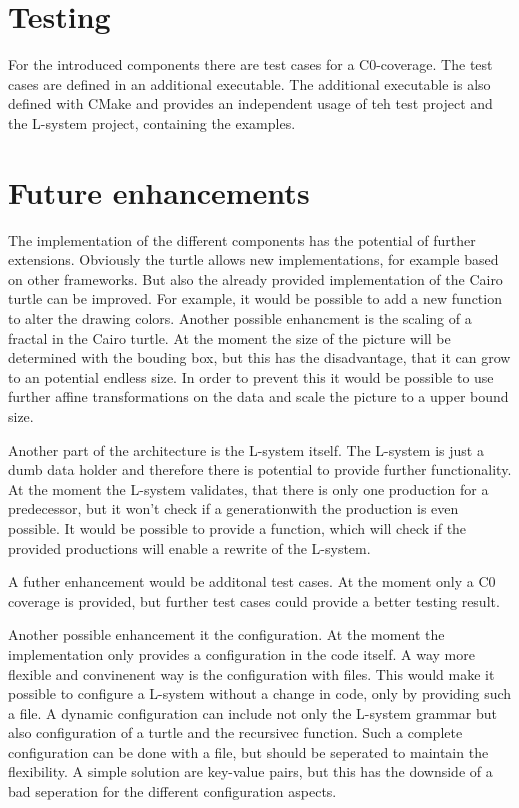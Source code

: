 \documentclass[english]{cpp-hmwk}
\begin{document}
\section{Testing}
\label{section:test}

For the introduced components there are test cases for a C0-coverage. The test cases are defined in an additional executable. The additional executable is also defined with CMake and provides an independent usage of teh test project and the L-system project, containing the examples.

\section{Future enhancements}

The implementation of the different components has the potential of further extensions. Obviously the turtle allows new implementations, for example based on other frameworks. But also the already provided implementation of the Cairo turtle can be improved. For example, it would be possible to add a new function to alter the drawing colors. Another possible enhancment is the scaling of a fractal in the Cairo turtle. At the moment the size of the picture will be determined with the bouding box, but this has the disadvantage, that it can grow to an potential endless size. In order to prevent this it would be possible to use further affine transformations on the data and scale the picture to a upper bound size.

\noindent Another part of the architecture is the L-system itself. The L-system is just a dumb data holder and therefore there is potential to provide further functionality. At the moment the L-system validates, that there is only one production for a predecessor, but it won't check if a generationwith the production is even possible. It would be possible to provide a function, which will check if the provided productions will enable a rewrite of the L-system. 

\noindent A futher enhancement would be additonal test cases. At the moment only a C0 coverage is provided, but further test cases could provide a better testing result.

\noindent Another possible enhancement it the configuration. At the moment the implementation only provides a configuration in the code itself. A way more flexible and convinenent way is the configuration with files. This would make it possible to configure a L-system without a change in code, only by providing such a file. A dynamic configuration can include not only the L-system grammar but also configuration of a turtle and the recursivec function. Such a complete configuration can be done with a file, but should be seperated to maintain the flexibility. A simple solution are key-value pairs, but this has the downside of a bad seperation for the different configuration aspects.
\end{document}
